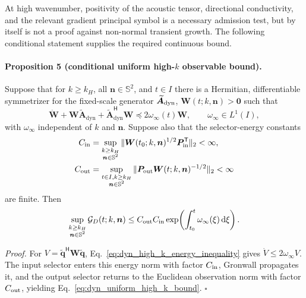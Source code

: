 At high wavenumber, positivity of the acoustic tensor, directional
conductivity, and the relevant gradient principal symbol is a necessary
admission test, but by itself is not a proof against non-normal transient
growth.  The following conditional statement supplies the required continuous
bound.

\paragraph{Proposition 5 (conditional uniform high-$k$ observable bound).}
Suppose that for $k\ge k_H$, all $\boldsymbol n\in\mathbb S^2$, and
$t\in I$ there is a Hermitian, differentiable symmetrizer for the fixed-scale
generator $\widetilde{\boldsymbol A}_{\rm dyn}$,
$\boldsymbol W(t;k,\boldsymbol n)>\boldsymbol0$ such that
\begin{equation}
 \dot{\boldsymbol W}
 +\boldsymbol W\widetilde{\boldsymbol A}_{\mathrm{dyn}}
 +\widetilde{\boldsymbol A}_{\mathrm{dyn}}^{\mathsf H}\boldsymbol W
 \preceq2\omega_\infty(t)\boldsymbol W,
 \qquad \omega_\infty\in L^1(I),
 \label{eq:dyn_high_k_energy_inequality}
\end{equation}
with $\omega_\infty$ independent of $k$ and $\boldsymbol n$.  Suppose also
that the selector-energy constants
\begin{align}
 C_{\rm in}
 &=\sup_{\substack{k\ge k_H\\\boldsymbol n\in\mathbb S^2}}
 \|\boldsymbol W(t_0;k,\boldsymbol n)^{1/2}
   \boldsymbol P_{\rm in}^{\mathsf T}\|_2<\infty,\\
 C_{\rm out}
 &=\sup_{\substack{t\in I,k\ge k_H\\\boldsymbol n\in\mathbb S^2}}
 \|\boldsymbol P_{\rm out}
   \boldsymbol W(t;k,\boldsymbol n)^{-1/2}\|_2<\infty
 \label{eq:dyn_high_k_selector_constants}
\end{align}
are finite.  Then
\begin{equation}
 \sup_{\substack{k\ge k_H\\\boldsymbol n\in\mathbb S^2}}
 \mathcal G_D(t;k,\boldsymbol n)
 \le
 C_{\rm out}C_{\rm in}
 \exp\!\left(\int_{t_0}^{t}\omega_\infty(\xi)\,\mathrm d\xi\right).
 \label{eq:dyn_uniform_high_k_bound}
\end{equation}

\emph{Proof.}
For $V=\widetilde{\boldsymbol q}^{\mathsf H}
\boldsymbol W\widetilde{\boldsymbol q}$,
Eq.~\eqref{eq:dyn_high_k_energy_inequality} gives
$\dot V\le2\omega_\infty V$.  The input selector enters this energy norm with
factor $C_{\rm in}$, Gronwall propagates it, and the output selector returns to
the Euclidean observation norm with factor $C_{\rm out}$, yielding
Eq.~\eqref{eq:dyn_uniform_high_k_bound}. \hfill$\square$

